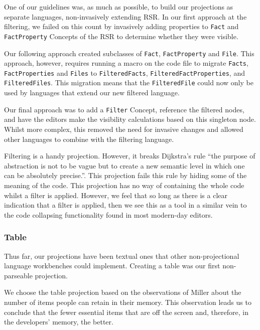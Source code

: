 One of our guidelines was, as much as possible, to build our projections as separate languages, non-invasively extending RSR.
In our first approach at the filtering, we failed on this count by invasively adding properties to \texttt{Fact} and \texttt{FactProperty} Concepts of the RSR to determine whether they were visible.

Our following approach created subclasses of \texttt{Fact}, \texttt{FactProperty} and \texttt{File}.
This approach, however, requires running a macro on the code file to migrate \texttt{Facts}, \texttt{FactProperties} and \texttt{Files} to \texttt{FilteredFacts}, \texttt{FilteredFactProperties}, and \texttt{FilteredFiles}.
This migration means that the \texttt{FilteredFile} could now only be used by languages that extend our new filtered language.

Our final approach was to add a \texttt{Filter} Concept, reference the filtered nodes, and have the editors make the visibility calculations based on this singleton node.
Whilst more complex, this removed the need for invasive changes and allowed other languages to combine with the filtering language.

Filtering is a handy projection.
However, it breaks Dijkstra's rule ``the purpose of abstraction is not to be vague but to create a new semantic level in which one can be absolutely precise.''\cite{dijkstra1972humble}.
This projection fails this rule by hiding some of the meaning of the code.
This projection has no way of containing the whole code whilst a filter is applied.
However, we feel that so long as there is a clear indication that a filter is applied, then we see this as a tool in a similar vein to the code collapsing functionality found in most modern-day editors.

\subsubsection{Table}
Thus far, our projections have been textual ones that other non-projectional language workbenches could implement.
Creating a table was our first non-parseable projection.

We choose the table projection based on the observations of Miller\cite{miller1956magical} about the number of items people can retain in their memory.
This observation leads us to conclude that the fewer essential items that are off the screen and, therefore, in the developers' memory, the better.


